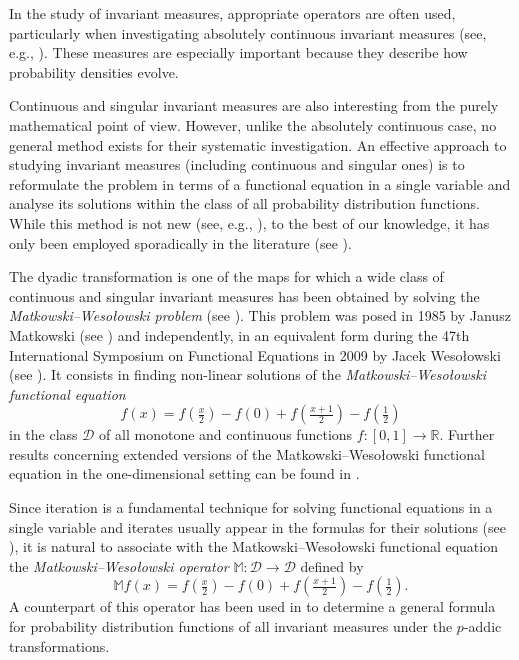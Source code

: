 \documentclass{amsart}
\theoremstyle{plain}%
\theoremstyle{definition}
\theoremstyle{remark}
\begin{document}
In the study of invariant measures, appropriate operators are often used, particularly when investigating absolutely continuous invariant measures (see, e.g., \cite{LY73,B00,GB03,BG05,I12}). These measures are especially important because they describe how probability densities evolve.

Continuous and singular invariant measures are also interesting from the purely mathematical point of view. However, unlike the absolutely continuous case, no general method exists for their systematic investigation. An effective approach to studying invariant measures (including continuous and singular ones) is to reformulate the problem in terms of a functional equation in a single variable and analyse its solutions within the class of all probability distribution functions. While this method is not new (see, e.g., \cite{M85,N91}), to the best of our knowledge, it has only been employed sporadically in the literature (see \cite{MZ22,MS23}). 

The dyadic transformation is one of the maps for which a wide class of continuous and singular invariant measures has been obtained by solving the \emph{Matkowski--Wesołowski problem} (see \cite{MZ18,MZ21,MZ25}). This problem was posed in 1985 by Janusz Matkowski (see \cite{M85}) and independently, in an equivalent form during the 47th International Symposium on Functional Equations in 2009 by Jacek Wesołowski (see \cite{MZ18}). It consists in finding non-linear solutions of the \emph{Matkowski--Wesołowski functional equation} 
\begin{equation}\label{MWeq}
f(x)=f\left(\tfrac{x}{2}\right)-f(0)+f\left(\tfrac{x+1}{2}\right)-f\left(\tfrac{1}{2}\right)	
\end{equation}
in the class  $\mathcal D$ of all monotone and continuous functions $f\colon[0,1]\to\mathbb R$. Further results concerning extended versions of the Matkowski--Wesołowski functional equation in the one-dimensional setting can be found in \cite{MZ19}.

Since iteration is a fundamental technique for solving functional equations in a single variable and iterates usually appear in the formulas for their solutions (see \cite[Section~0.3]{KCG90}), it is natural to associate with the Matkowski--Wesołowski functional equation the \emph{Matkowski--Wesołowski operator} $\mathbb M\colon\mathcal D\to\mathcal D$ defined by 
\begin{equation}\label{MWop}
\mathbb M f(x)=f\left(\tfrac{x}{2}\right)-f(0)+f\left(\tfrac{x+1}{2}\right)-f\left(\tfrac{1}{2}\right).
\end{equation}
A counterpart of this operator has been used in \cite{MZa} to determine a general formula for probability distribution functions of all invariant measures under the $p$-addic transformations. 
\end{document}
